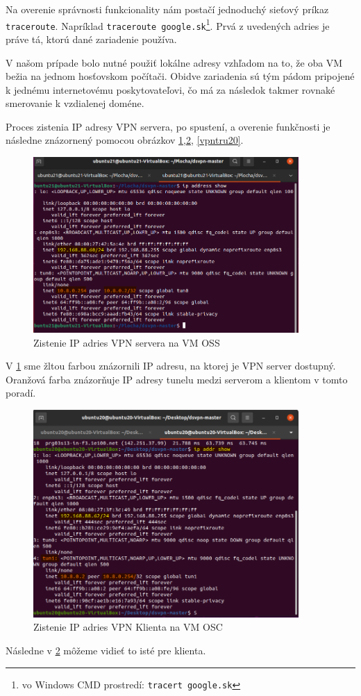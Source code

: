 Na overenie správnosti funkcionality nám postačí jednoduchý sieťový príkaz \lstinline|traceroute|. Napríklad \lstinline|traceroute google.sk|\footnote{vo Windows CMD prostredí: \lstinline|tracert google.sk|}. Prvá z uvedených adries je práve tá, ktorú dané zariadenie používa. 

V našom prípade bolo nutné použiť lokálne adresy vzhľadom na to, že oba VM bežia na jednom hosťovskom počítači. Obidve zariadenia sú tým pádom pripojené k jednému internetovému poskytovateľovi, čo má za následok takmer rovnaké smerovanie k vzdialenej doméne. 

Proces zistenia IP adresy VPN servera, po spustení, a overenie funkčnosti je následne znázornený pomocou obrázkov \ref{ipu21},\ref{ipu20}, \ref{vpntru20}.

\begin{figure}[!h]
	\centering
	\includegraphics[width=0.9\textwidth]{figures/ipu21}
	\caption{Zistenie IP adries VPN servera na VM OSS}
	\label{ipu21}
\end{figure}
V  \ref{ipu21} sme žltou farbou znázornili IP adresu, na ktorej je VPN server dostupný. Oranžová farba znázorňuje IP adresy tunelu medzi serverom a klientom v tomto poradí. 

\begin{figure}[!h]
	\centering
	\includegraphics[width=0.9\textwidth]{figures/ipu20}
	\caption{Zistenie IP adries VPN Klienta na VM OSC}
	\label{ipu20}
\end{figure}
Následne v \ref{ipu20} môžeme vidieť to isté pre klienta.
  
